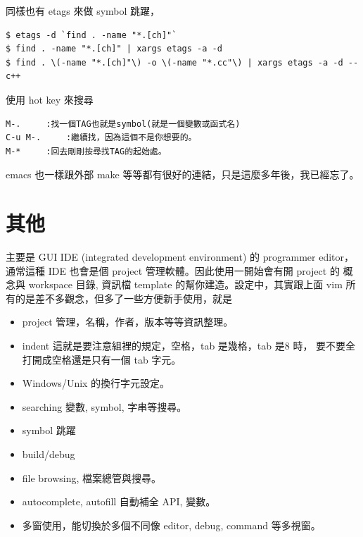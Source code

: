 同樣也有 etags 來做 symbol 跳躍，
\begin{verbatim}
$ etags -d `find . -name "*.[ch]"`
$ find . -name "*.[ch]" | xargs etags -a -d
$ find . \(-name "*.[ch]"\) -o \(-name "*.cc"\) | xargs etags -a -d --c++
\end{verbatim}
使用 hot key 來搜尋
\begin{verbatim}
M-.		:找一個TAG也就是symbol(就是一個變數或函式名)
C-u M-.		:繼續找，因為這個不是你想要的。
M-*		:回去剛剛按尋找TAG的起始處。
\end{verbatim}
  emacs 也一樣跟外部 make 等等都有很好的連結，只是這麼多年後，我已經忘了。

  \section{其他}
  主要是 GUI IDE (integrated development environment) 的 programmer editor，
  通常這種 IDE 也會是個 project 管理軟體。因此使用一開始會有開 project 的
  概念與 workspace 目錄, 資訊檔 template 的幫你建造。設定中，其實跟上面 vim
  所有的是差不多觀念，但多了一些方便新手使用，就是
  \begin{itemize}
    \item project 管理，名稱，作者，版本等等資訊整理。
    \item indent 這就是要注意組裡的規定，空格，tab 是幾格，tab 是8 時，
      要不要全打開成空格還是只有一個 tab 字元。
    \item Windows/Unix 的換行字元設定。
    \item searching 變數, symbol, 字串等搜尋。
    \item symbol 跳躍
    \item build/debug
    \item file browsing, 檔案總管與搜尋。
    \item autocomplete, autofill 自動補全 API, 變數。
    \item 多窗使用，能切換於多個不同像 editor, debug, command 等多視窗。
  \end{itemize}
